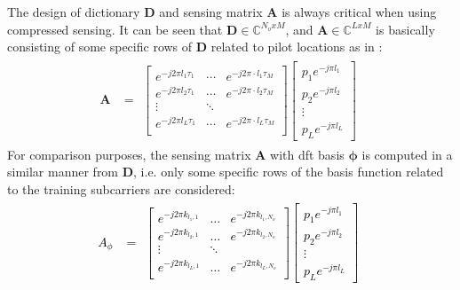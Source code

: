 {{ The design of dictionary $\mathbf{D}$ and sensing matrix $\mathbf{A}$ is always critical when using compressed sensing. It can be seen that $\mathbf{D} \in \mathbb{C}^{N_oxM}$, and $\mathbf{A} \in \mathbb{C}^{LxM}$ is basically consisting of some specific rows of $\mathbf{D}$ related to pilot locations as in \cite{review17}:
	\begin{align}
	\mathbf{A} &= 
	\begin{matrix}
	\begin{bmatrix}
	e^{-j2\pi l_1 \tau_1} &\cdots& e^{-j2\pi\cdot l_1\tau_M} \\
	e^{-j2\pi l_2\tau_1} &\cdots& e^{-j2\pi\cdot l_2\tau_M} \\
	\vdots & \ddots & \\                                                                                     
	e^{-j2\pi l_L \tau_1}  &\cdots& e^{-j2\pi \cdot l_L\tau_M} \\
	\end{bmatrix}
	\begin{bmatrix}
	 p_1e^{-j\pi l_1}\\
	 p_2e^{-j\pi l_2}\\
	 \vdots\\
	 p_Le^{-j\pi l_L}
	\end{bmatrix}
	\end{matrix}
	\end{align}
	For comparison purposes, the sensing matrix $\mathbf{A}$ with dft basis $\mathbf{\phi}$ is computed in a similar manner from $\mathbf{D}$, i.e. only some specific rows of the basis function related to the training subcarriers are considered:}
  \textcolor{black}{
 	\begin{align}
 	A_\phi &= 
 	\begin{matrix}
 	\begin{bmatrix}
 	e^{-j2\pi k_{l_1,1}} &\dots& e^{-j2\pi k_{l_1,N_o}} \\
 	e^{-j2\pi k_{l_2,1}} &\dots& e^{-j2\pi k_{l_2,N_o}} \\
 	\vdots & \ddots & \\                                                                                     
 	e^{-j2\pi k_{l_L,1}}  &\dots& e^{-j2\pi k_{l_L,N_o}} \\
 	\end{bmatrix}
 	\begin{bmatrix}
 	p_1e^{-j\pi l_1}\\
 	p_2e^{-j\pi l_2}\\
 	\vdots\\
 	p_Le^{-j\pi l_L}
 	\end{bmatrix}
 	\end{matrix}
 	\end{align}}}
